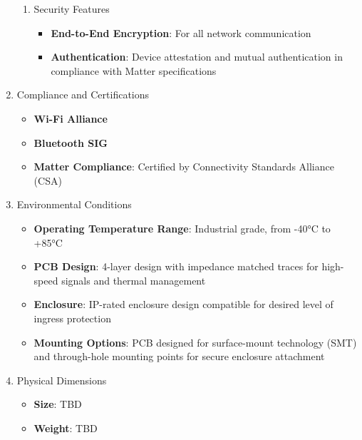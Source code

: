 \documentclass[conference]{IEEEtran}
\begin{document}
\begin{enumerate}[label=\arabic*.]
\begin{enumerate}[label=\alph*.]
\item Security Features\\
\begin{itemize}
\item \textbf{End-to-End Encryption}: For all network communication\\
\item \textbf{Authentication}: Device attestation and mutual authentication in compliance with Matter specifications\\
\end{itemize}

\end{enumerate}


\item Compliance and Certifications\\
\begin{itemize}
\item \textbf{Wi-Fi Alliance}\\
\item \textbf{Bluetooth SIG}\\
\item \textbf{Matter Compliance}: Certified by Connectivity Standards Alliance (CSA)\\
\end{itemize}

\item Environmental Conditions\\
\begin{itemize}
\item \textbf{Operating Temperature Range}: Industrial grade, from -40°C to +85°C\\
\item \textbf{PCB Design}: 4-layer design with impedance matched traces for high-speed signals and thermal management\\
\item \textbf{Enclosure}: IP-rated enclosure design compatible for desired level of ingress protection\\
\item \textbf{Mounting Options}: PCB designed for surface-mount technology (SMT) and through-hole mounting points for secure enclosure attachment\\
\end{itemize}

\item Physical Dimensions\\
\begin{itemize}
\item \textbf{Size}: TBD\\
\item \textbf{Weight}: TBD\\
\end{itemize}


\end{enumerate}
\end{document}

